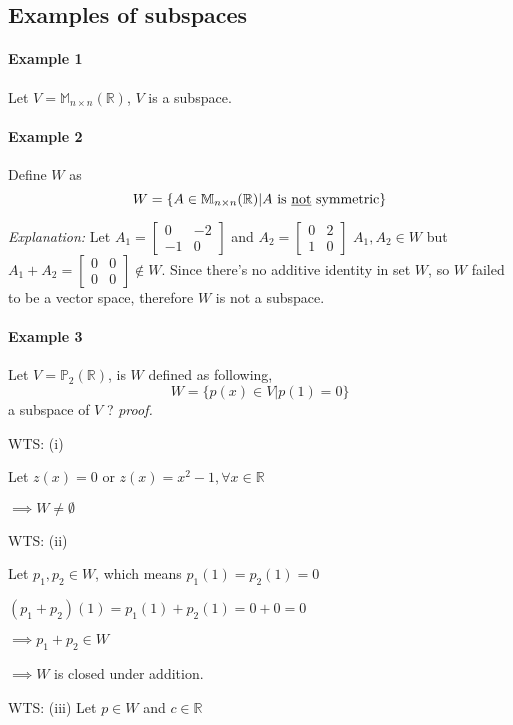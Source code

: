 \documentclass[11pt]{article}
\begin{document}
	\subsection{Examples of subspaces}
	\paragraph{Example 1} Let $V = \mathbb{M}_{n \times n} (\mathbb{R})$, $V$ is a subspace.
	\paragraph{Example 2} Define $W$ as
	\[
	W = \{A \in \mathbb{M}_{n \times n} (\mathbb{R}) \vert \text{$A$ is \underbar{not} symmetric} \}
	\]
	
	\emph{Explanation:} Let $A_1 = \begin{bmatrix}0 & -2 \\ -1 & 0 \end{bmatrix}$ and $A_2 = \begin{bmatrix} 0 & 2 \\ 1 & 0 \end{bmatrix}$ $A_1, A_2 \in W$ but $A_1 + A_2 = \begin{bmatrix} 0&0\\0&0 \end{bmatrix} \notin W$.
	\newline
	Since there's no additive identity in set $W$, so $W$ failed to be a vector space, therefore $W$ is not a subspace.
	\paragraph{Example 3} Let $V = \mathbb{P}_2(\mathbb{R})$, is $W$ defined as following,
	\[
	W = \{p(x) \in V \vert p(1) = 0\}
	\]
	a subspace of $V$ ?
	\newline
	\emph{proof.}
	
	WTS: (i)
	
	Let $z(x) = 0$ or $z(x) = x^2 - 1, \forall x \in \mathbb{R}$
	
	$\implies W \neq \emptyset$
	
	WTS: (ii)
	
	Let $p_1, p_2 \in W$, which means $p_1(1) = p_2(1) = 0$
	
	$(p_1 + p_2)(1) = p_1(1) + p_2(1) = 0 + 0 = 0$
	
	$\implies p_1+p_2 \in W$
	
	$\implies W$ is closed under addition.
	
	WTS: (iii)
	Let $p \in W$ and $c \in \mathbb{R}$
	
\end{document}
